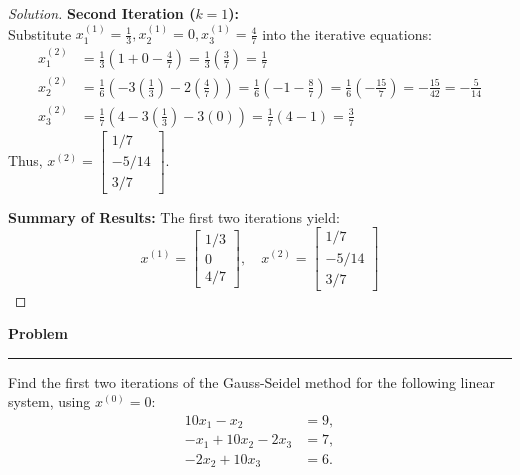 \documentclass[11pt, a4paper]{article}
\newenvironment{problem}{%
  \begin{tcolorbox}[
    colback=blue!4!white,
    colframe=blue!38!black,
    boxrule=0.95pt,
    arc=3pt,
    left=11pt,
    right=11pt,
    top=10pt,
    bottom=11pt,
    before skip=12pt,
    after skip=14pt,
  ]
  \noindent\textbf{\textcolor{blue!35!black}{Problem}}\par\nointerlineskip
  {\color{blue!42!black}\rule{\linewidth}{0.55pt}}\par\vspace{0.55em}%
}{%
  \end{tcolorbox}%
}
\newif\ifsolutionnewpage
\newenvironment{solution}
  {\begin{proof}[Solution]}
  {\end{proof}\ifsolutionnewpage\newpage\fi}
\begin{document}
\begin{solution}
    \textbf{Second Iteration ($k=1$):} \\
    Substitute $x_1^{(1)} = \frac{1}{3}, x_2^{(1)} = 0, x_3^{(1)} = \frac{4}{7}$ into the iterative equations:
    \begin{align*}
        x_{1}^{(2)} &= \frac{1}{3} \left( 1 + 0 - \frac{4}{7} \right) = \frac{1}{3} \left( \frac{3}{7} \right) = \frac{1}{7} \\[1ex]
        x_{2}^{(2)} &= \frac{1}{6} \left( -3\left(\frac{1}{3}\right) - 2\left(\frac{4}{7}\right) \right) = \frac{1}{6} \left( -1 - \frac{8}{7} \right) = \frac{1}{6} \left( -\frac{15}{7} \right) = -\frac{15}{42} = -\frac{5}{14} \\[1ex]
        x_{3}^{(2)} &= \frac{1}{7} \left( 4 - 3\left(\frac{1}{3}\right) - 3(0) \right) = \frac{1}{7} \left( 4 - 1 \right) = \frac{3}{7}
    \end{align*}
    Thus, $x^{(2)} = \begin{bmatrix} 1/7 \\ -5/14 \\ 3/7 \end{bmatrix}$.

    \textbf{Summary of Results:}
    The first two iterations yield:
    \[
    x^{(1)} = \begin{bmatrix} 1/3 \\ 0 \\ 4/7 \end{bmatrix}, \quad x^{(2)} = \begin{bmatrix} 1/7 \\ -5/14 \\ 3/7 \end{bmatrix}
    \]
\end{solution}


\begin{problem}
    Find the first two iterations of the Gauss-Seidel method for the following linear system, using $x^{(0)}=0$:
    \begin{align*}
        10x_{1}-x_{2} &= 9, \\
        -x_{1}+10x_{2}-2x_{3} &= 7, \\
        -2x_{2}+10x_{3} &= 6.
    \end{align*}
\end{problem}
\end{document}
